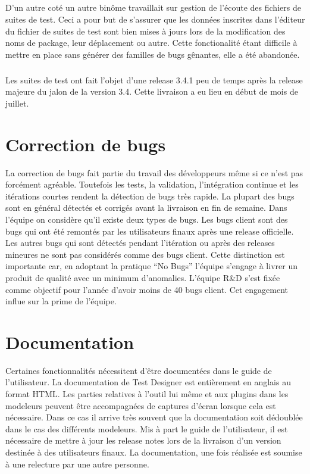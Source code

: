 \subparagraph*{}
D'un autre coté un autre binôme travaillait sur gestion de l'écoute des fichiers de suites de test. Ceci a pour but de s'assurer que les données inscrites dans l'éditeur du fichier de suites de test sont bien mises à jours lors de la modification des noms de package, leur déplacement ou autre. Cette fonctionalité étant difficile à mettre en place sans générer des familles de bugs gênantes, elle a été abandonée.
\subparagraph*{}
Les suites de test ont fait l'objet d'une release 3.4.1 peu de temps après la release majeure du jalon de la version 3.4. Cette livraison a eu lieu en début de mois de juillet.
\section{Correction de bugs}
La correction de bugs fait partie du travail des développeurs même si ce n'est pas forcément agréable. Toutefois les tests, la validation, l'intégration continue et les itérations courtes rendent la détection de bugs très rapide. La plupart des bugs sont en général détectés et corrigés avant la livraison en fin de semaine. Dans l'équipe on considère qu'il existe deux types de bugs. Les bugs client sont des bugs qui ont été remontés par les utilisateurs finaux après une release officielle. Les autres bugs qui sont détectés pendant l'itération ou après des releases mineures ne sont pas considérés comme des bugs client. Cette distinction est importante car, en adoptant la pratique ``No Bugs'' l'équipe s'engage à livrer un produit de qualité avec un minimum d'anomalies. L'équipe R\&D s'est fixée comme objectif pour l'année d'avoir moins de 40 bugs client. Cet engagement influe sur la prime de l'équipe.
\section{Documentation}
Certaines fonctionnalités nécessitent d'être documentées dans le guide de l'utilisateur. La documentation de Test Designer est entièrement en anglais au format HTML. Les parties relatives à l'outil lui même et aux plugins dans les modeleurs peuvent être accompagnées de captures d'écran lorsque cela est nécessaire. Dans ce cas il arrive très souvent que la documentation soit dédoublée dans le cas des différents modeleurs. Mis à part le guide de l'utilisateur, il est nécessaire de mettre à jour les release notes lors de la livraison d'un version destinée à des utilisateurs finaux. La documentation, une fois réalisée est soumise à une relecture par une autre personne.
